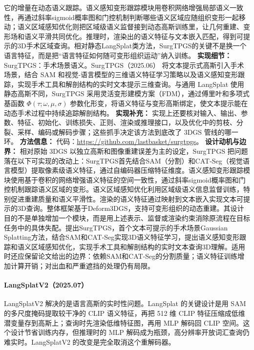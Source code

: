 它的增量在动态语义跟踪。语义感知变形跟踪模块用卷积网络增强局部语义一致性，再通过斜率sigmoid概率图和门控机制判断哪些语义区域应随组织变形一起移动；语义区域感知优化则把区域级语义监督接到动态高斯训练里，让几何重建、变形场和语义平滑共同优化。推理时，渲染出的语义特征与文本嵌入匹配，得到可提示的3D手术区域查询。相对静态LangSplat类方法，SurgTPGS的关键不是换一个语言特征，而是把“语言特征如何随可变形组织运动”纳入训练。
\textbf{实现细节：} SurgTPGS：手术场景语义。SurgTPGS（2025.06） 将文本提示式高斯引入手术场景，结合 SAM 和视觉-语言模型的三维语义特征学习策略以及语义感知变形跟踪，实现手术工具和解剖结构的实时文本提示三维查询。与通用 LangSplat 使用静态高斯不同，SurgTPGS 采用灵活变形建模方案（FDM），通过傅里叶和多项式基函数 $\Phi(\tau; \omega, \mu, \sigma)$ 参数化形变，将语义特征与变形高斯绑定，使文本提示能在动态手术过程中持续追踪解剖结构。
\textbf{实现补充：} 实现上还要核对输入、输出、参数、特征、初始化、训练损失、正则、渲染或推理接口，以及优化中的剪枝、分裂、采样、编码或解码步骤；这些抓手决定该方法到底改了 3DGS 管线的哪一环。
\textbf{方法信息：} 代码：\url{https://github.com/lastbasket/surgtpgs}。
\textbf{设计动机与边界：} 相对原始 3DGS 以独立高斯和图像重建误差为主的设定，SurgTPGS 把问题落在以下可实现的改动上：SurgTPGS首先结合SAM（分割）和CAT-Seg（视觉语言模型）提取像素级语义特征，通过自编码器压缩特征维度。语义感知变形跟踪模块使用基于卷积的网络增强语义特征的空间一致性，通过斜率sigmoid概率图和门控机制跟踪语义区域的变形。语义区域感知优化利用区域级语义信息监督训练，特别促进重建质量和语义平滑性。渲染的语义特征通过映射到文本嵌入实现文本可提示的3D查询。整体框架基于Deform3DGS，支持可变形组织的动态重建。其设计目的不是单独增加一个模块，而是用上述表示、监督或渲染约束消除原流程在目标任务中的具体失配。提出SurgTPGS，首个文本可提示的手术场景Gaussian Splatting方法，结合SAM和CAT-Seg实现3D语义特征学习，提出语义感知变形跟踪和语义区域感知优化，实现手术工具和解剖结构的实时文本查询3D理解。适用时还应保留论文给出的边界：依赖SAM和CAT-Seg的分割质量；语义特征训练增加计算开销；对出血和严重遮挡的处理仍有局限。
\paragraph{LangSplatV2（2025.07）\cite{2507_07136}}
LangSplatV2 解决的是语言高斯的实时性问题。LangSplat 的关键设计是用 SAM 的多尺度掩码提取较干净的 CLIP 语义特征，再把 512 维 CLIP 特征压缩成低维潜变量存到高斯上；查询时先渲染低维特征图，再用 MLP 解码回 CLIP 空间。这个设计节省训练内存，但推理时的 MLP 解码成为瓶颈，高分辨率开放词汇查询仍难实时。LangSplatV2 的改变是完全取消这个重解码器。

